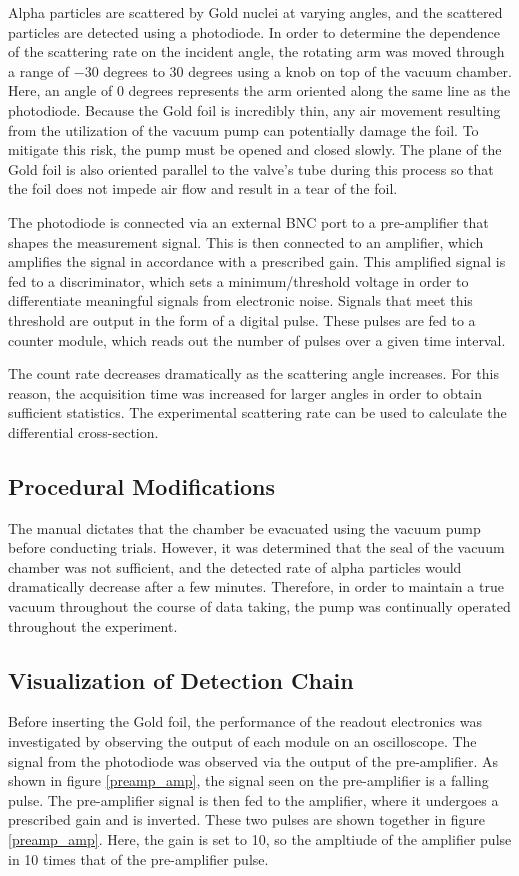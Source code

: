 \documentclass[a4paper]{article}
\begin{document}
\qq Alpha particles are scattered by Gold nuclei at varying angles, and the
scattered particles are detected using a photodiode. In order to determine the
dependence of the scattering rate on the incident angle, the rotating arm was
moved through a range of $-30$ degrees to $30$ degrees using a knob on top of
the vacuum chamber. Here, an angle of 0 degrees represents the arm oriented
along the same line as the photodiode. Because the Gold foil is
incredibly thin, any air movement resulting from the utilization of the vacuum pump can potentially damage the foil. To mitigate this risk, the pump must be opened and closed slowly. The plane of the Gold foil is also oriented parallel to the valve's tube during this process so that the foil does not impede air flow and result in a tear of the foil.

\qq The photodiode is connected via an external BNC port to a pre-amplifier that
shapes the measurement signal. This is then connected to an amplifier, which
amplifies the signal in accordance with a prescribed gain. This amplified signal
is fed to a discriminator, which sets a minimum/threshold voltage in order to
differentiate meaningful signals from electronic noise. Signals that meet this
threshold are output in the form of a digital pulse. These pulses are fed to a
counter module, which reads out the number of pulses over a given time interval.

The count rate decreases dramatically as the scattering angle increases. For
this reason, the acquisition time was increased for larger angles in order to
obtain sufficient statistics. The experimental scattering rate can be used to
calculate the differential cross-section.

\subsection{Procedural Modifications}
\qq The manual dictates that the chamber be evacuated using the vacuum pump
before conducting trials. However, it was determined that the seal of the vacuum
chamber was not sufficient, and the detected rate of alpha particles would
dramatically decrease after a few minutes. Therefore, in order to maintain a
true vacuum throughout the course of data taking, the pump was continually
operated throughout the experiment.  \qq

\subsection{Visualization of Detection Chain}
Before inserting the Gold foil, the performance of the readout electronics was investigated by observing the output of each module on an oscilloscope. The signal from the photodiode was observed via the output of the pre-amplifier. As shown in figure \ref{preamp_amp}, the signal seen on the pre-amplifier is a falling pulse. The pre-amplifier signal is then fed to the amplifier, where it undergoes a prescribed gain and is inverted. These two pulses are shown together in figure \ref{preamp_amp}. Here, the gain is set to 10, so the ampltiude of the amplifier pulse in 10 times that of the pre-amplifier pulse.
\end{document}
